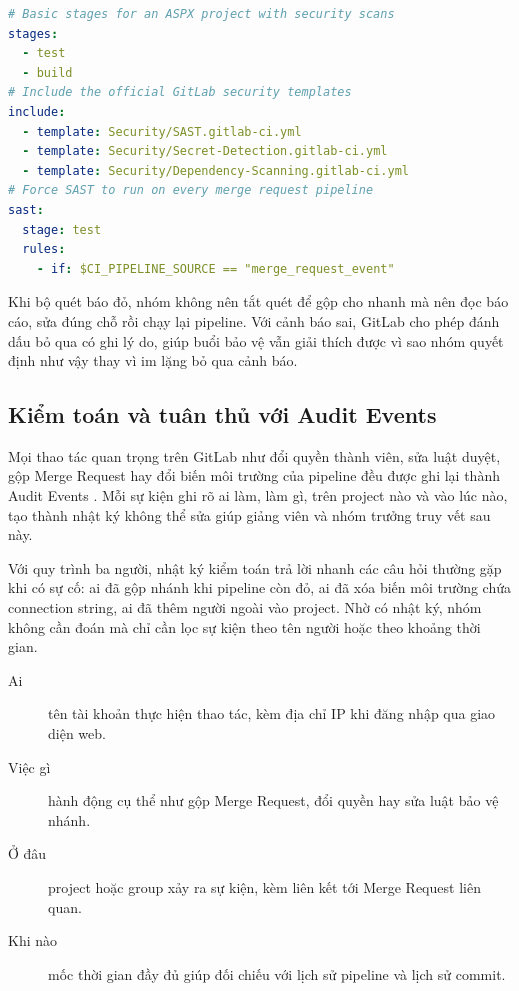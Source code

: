 \begin{lstlisting}[language=yaml, caption={Bat cac bo quet bao mat co ban}, label={lst:c53-security}]
# Basic stages for an ASPX project with security scans
stages:
  - test
  - build
# Include the official GitLab security templates
include:
  - template: Security/SAST.gitlab-ci.yml
  - template: Security/Secret-Detection.gitlab-ci.yml
  - template: Security/Dependency-Scanning.gitlab-ci.yml
# Force SAST to run on every merge request pipeline
sast:
  stage: test
  rules:
    - if: $CI_PIPELINE_SOURCE == "merge_request_event"
\end{lstlisting}

Khi bộ quét báo đỏ, nhóm không nên tắt quét để gộp cho nhanh mà nên đọc báo cáo, sửa đúng chỗ rồi chạy lại pipeline. Với cảnh báo sai, GitLab cho phép đánh dấu bỏ qua có ghi lý do, giúp buổi bảo vệ vẫn giải thích được vì sao nhóm quyết định như vậy thay vì im lặng bỏ qua cảnh báo.

\subsection{Kiểm toán và tuân thủ với Audit Events}

Mọi thao tác quan trọng trên GitLab như đổi quyền thành viên, sửa luật duyệt, gộp Merge Request hay đổi biến môi trường của pipeline đều được ghi lại thành Audit Events \cite{gitlabdocs}. Mỗi sự kiện ghi rõ ai làm, làm gì, trên project nào và vào lúc nào, tạo thành nhật ký không thể sửa giúp giảng viên và nhóm trưởng truy vết sau này.

Với quy trình ba người, nhật ký kiểm toán trả lời nhanh các câu hỏi thường gặp khi có sự cố: ai đã gộp nhánh khi pipeline còn đỏ, ai đã xóa biến môi trường chứa connection string, ai đã thêm người ngoài vào project. Nhờ có nhật ký, nhóm không cần đoán mà chỉ cần lọc sự kiện theo tên người hoặc theo khoảng thời gian.

\begin{description}
    \item[Ai] tên tài khoản thực hiện thao tác, kèm địa chỉ IP khi đăng nhập qua giao diện web.
    \item[Việc gì] hành động cụ thể như gộp Merge Request, đổi quyền hay sửa luật bảo vệ nhánh.
    \item[Ở đâu] project hoặc group xảy ra sự kiện, kèm liên kết tới Merge Request liên quan.
    \item[Khi nào] mốc thời gian đầy đủ giúp đối chiếu với lịch sử pipeline và lịch sử commit.
\end{description}

